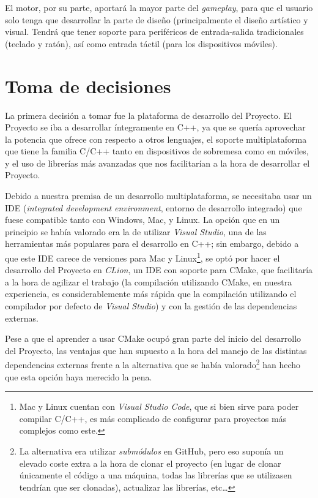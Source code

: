 \medskip

El motor, por su parte, aportará la mayor parte del \textit{gameplay}, para que el usuario solo tenga que desarrollar la parte de diseño (principalmente el diseño artístico y visual. Tendrá que tener soporte para periféricos de entrada-salida tradicionales (teclado y ratón), así como entrada táctil (para los dispositivos móviles). 

\section{Toma de decisiones}
La primera decisión a tomar fue la plataforma de desarrollo del Proyecto. El Proyecto se iba a desarrollar íntegramente en C++, ya que se quería aprovechar la potencia que ofrece con respecto a otros lenguajes, el soporte multiplataforma que tiene la familia C/C++ tanto en dispositivos de sobremesa como en móviles, y el uso de librerías más avanzadas que nos facilitarían a la hora de desarrollar el Proyecto.

\medskip

Debido a nuestra premisa de un desarrollo multiplataforma, se necesitaba usar un IDE (\textit{integrated development environment}, entorno de desarrollo integrado) que fuese compatible tanto con Windows, Mac, y Linux. La opción que en un principio se había valorado era la de utilizar \textit{Visual Studio}, una de las herramientas más populares para el desarrollo en C++; sin embargo, debido a que este IDE carece de versiones para Mac y Linux\footnote{Mac y Linux cuentan con \textit{Visual Studio Code}, que si bien sirve para poder compilar C/C++, es más complicado de configurar para proyectos más complejos como este.}, se optó por hacer el desarrollo del Proyecto en \textit{CLion}, un IDE con soporte para CMake, que facilitaría a la hora de agilizar el trabajo (la compilación utilizando CMake, en nuestra experiencia, es considerablemente más rápida que la compilación utilizando el compilador por defecto de \textit{Visual Studio}) y con la gestión de las dependencias externas.

\smallskip

Pese a que el aprender a usar CMake ocupó gran parte del inicio del desarrollo del Proyecto, las ventajas que han supuesto a la hora del manejo de las distintas dependencias externas frente a la alternativa que se había valorado\footnote{La alternativa era utilizar \textit{submódulos} en GitHub, pero eso suponía un elevado coste extra a la hora de clonar el proyecto (en lugar de clonar únicamente el código a una máquina, todas las librerías que se utilizasen tendrían que ser clonadas), actualizar las librerías, etc\ldots} han hecho que esta opción haya merecido la pena.

